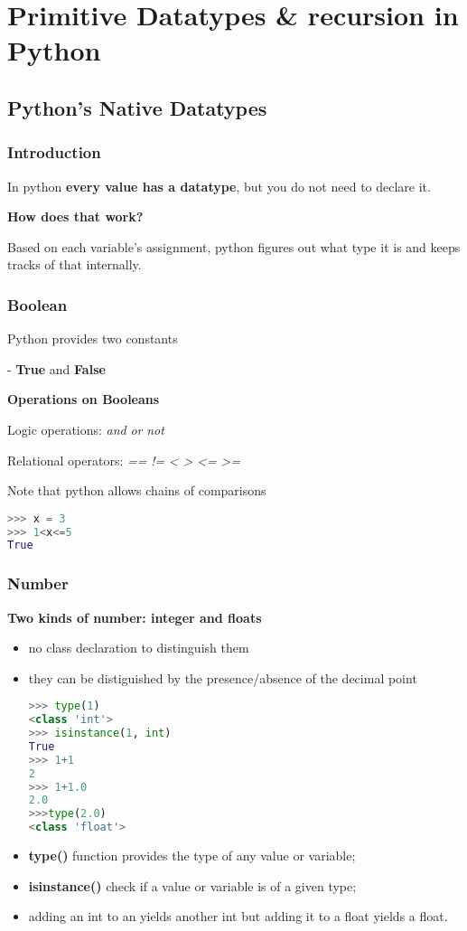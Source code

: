 \section{Primitive Datatypes \& recursion in Python}

\subsection{Python's Native Datatypes}

\subsubsection{Introduction}
In python \textbf{every value has a datatype}, but you do not need to declare it.

\textbf{How does that work?}

Based on each variable's assignment, python figures out what type it is and keeps tracks of that internally.

\subsubsection{Boolean}
Python provides two constants

- \textbf{True} and \textbf{False}

\textbf{Operations on Booleans}

Logic operations: \textit{and} \textit{or} \textit{not}

Relational operators: \textit{==} \textit{!=} \textit{<} \textit{>} \textit{<=} \textit{>=}

Note that python allows chains of comparisons
\begin{lstlisting}[language=Python]
>>> x = 3
>>> 1<x<=5
True
\end{lstlisting}

\subsubsection{Number}
\textbf{Two kinds of number: integer and floats}
\begin{itemize}
	\item no class declaration to distinguish them
	\item they can be distiguished by the presence/absence of the decimal point
\begin{lstlisting}[language=Python]
>>> type(1)
<class 'int'>
>>> isinstance(1, int)
True
>>> 1+1
2
>>> 1+1.0
2.0
>>>type(2.0)
<class 'float'>
\end{lstlisting}
	\item \textbf{type()} function provides the type of any value or variable;
	\item \textbf{isinstance()} check if a value or variable is of a given type;
	\item adding an int to an yields another int but adding it to a float yields a float.
\end{itemize}